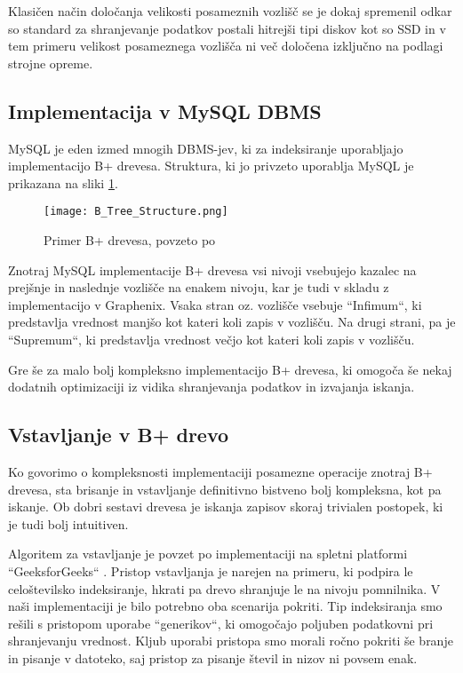 \documentclass[a4paper,12pt,openright]{book}
\begin{document}
        Klasičen način določanja velikosti posameznih vozlišč se je dokaj spremenil odkar so standard za shranjevanje podatkov postali hitrejši tipi diskov kot so SSD in v tem primeru velikost posameznega vozlišča ni več določena izključno na podlagi strojne opreme.

        \subsection{Implementacija v MySQL DBMS}
        \label{MYSQL_BPTREE}

        MySQL je eden izmed mnogih DBMS-jev, ki za indeksiranje uporabljajo implementacijo B+ drevesa. Struktura, ki jo privzeto uporablja MySQL je prikazana na sliki \ref{btree_innodb}.

        \begin{figure}[H]
            \centerline{\texttt{[image: B\_Tree\_Structure.png]}}
            \caption{Primer B+ drevesa, povzeto po \cite{BPTREE_INNODB}}
            \label{btree_innodb}
        \end{figure}

        \noindent
        Znotraj MySQL implementacije B+ drevesa vsi nivoji vsebujejo kazalec na prejšnje in naslednje vozlišče na enakem nivoju, kar je tudi v skladu z implementacijo v Graphenix. Vsaka stran oz. vozlišče vsebuje ``Infimum``, ki predstavlja vrednost manjšo kot kateri koli zapis v vozlišču. Na drugi strani, pa je ``Supremum``, ki predstavlja vrednost večjo kot kateri koli zapis v vozlišču.

        Gre še za malo bolj kompleksno implementacijo B+ drevesa, ki omogoča še nekaj dodatnih optimizaciji iz vidika shranjevanja podatkov in izvajanja iskanja.

        \subsection{Vstavljanje v B+ drevo}

        Ko govorimo o kompleksnosti implementaciji posamezne operacije znotraj B+ drevesa, sta brisanje in vstavljanje definitivno bistveno bolj kompleksna, kot pa iskanje. Ob dobri sestavi drevesa je iskanja zapisov skoraj trivialen postopek, ki je tudi bolj intuitiven.

        Algoritem za vstavljanje je povzet po implementaciji na spletni platformi ``GeeksforGeeks`` \cite{G4G_BINSERT}. Pristop vstavljanja je narejen na primeru, ki podpira le celoštevilsko indeksiranje, hkrati pa drevo shranjuje le na nivoju pomnilnika. V naši implementaciji je bilo potrebno oba scenarija pokriti. Tip indeksiranja smo rešili s pristopom uporabe ``generikov``, ki omogočajo poljuben podatkovni pri shranjevanju vrednost. Kljub uporabi pristopa smo morali ročno pokriti še branje in pisanje v datoteko, saj pristop za pisanje števil in nizov ni povsem enak.
\end{document}
